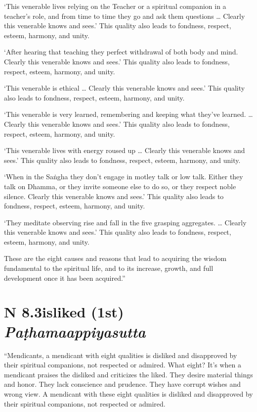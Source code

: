 \documentclass[12pt,openany]{book}%
\newcommand*{\suttatitleacronym}[1]{\smaller[2]{#1}\vspace*{.3em}}
\newcommand*{\suttatitletranslation}[1]{\linebreak{#1}}
\newcommand*{\suttatitleroot}[1]{\linebreak\smaller[2]\itshape{#1}}
\newcommand*{\tocacronym}[1]{\hspace*{-3.3em}{#1}\quad}
\newcommand*{\toctranslation}[1]{#1}
\newcommand*{\tocroot}[1]{(\textit{#1})}
\begin{document}
‘This venerable lives relying on the Teacher or a spiritual companion in a teacher’s role, and from time to time they go and ask them questions … Clearly this venerable knows and sees.’ This quality also leads to fondness, respect, esteem, harmony, and unity. 

‘After hearing that teaching they perfect withdrawal of both body and mind. Clearly this venerable knows and sees.’ This quality also leads to fondness, respect, esteem, harmony, and unity. 

‘This venerable is ethical … Clearly this venerable knows and sees.’ This quality also leads to fondness, respect, esteem, harmony, and unity. 

‘This venerable is very learned, remembering and keeping what they’ve learned. … Clearly this venerable knows and sees.’ This quality also leads to fondness, respect, esteem, harmony, and unity. 

‘This venerable lives with energy roused up … Clearly this venerable knows and sees.’ This quality also leads to fondness, respect, esteem, harmony, and unity. 

‘When in the \textsanskrit{Saṅgha} they don’t engage in motley talk or low talk. Either they talk on Dhamma, or they invite someone else to do so, or they respect noble silence. Clearly this venerable knows and sees.’ This quality also leads to fondness, respect, esteem, harmony, and unity. 

‘They meditate observing rise and fall in the five grasping aggregates. … Clearly this venerable knows and sees.’ This quality also leads to fondness, respect, esteem, harmony, and unity. 

These are the eight causes and reasons that lead to acquiring the wisdom fundamental to the spiritual life, and to its increase, growth, and full development once it has been acquired.” 

%
\section*{{\suttatitleacronym AN 8.3}{\suttatitletranslation Disliked (1st) }{\suttatitleroot Paṭhamaappiyasutta}}
\addcontentsline{toc}{section}{\tocacronym{AN 8.3} \toctranslation{Disliked (1st) } \tocroot{Paṭhamaappiyasutta}}

“Mendicants, a mendicant with eight qualities is disliked and disapproved by their spiritual companions, not respected or admired. What eight? It’s when a mendicant praises the disliked and criticizes the liked. They desire material things and honor. They lack conscience and prudence. They have corrupt wishes and wrong view. A mendicant with these eight qualities is disliked and disapproved by their spiritual companions, not respected or admired. 
\end{document}
